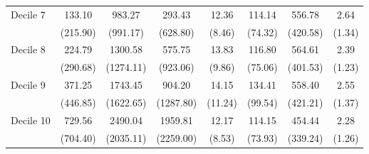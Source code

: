 \begin{spacing}{1.0}
\begin{table}[h]
\begin{threeparttable}
\begin{tabular}{l*{1}{ccccccc}}
\customlinespace Decile 7        &      133.10&      983.27&      293.43&       12.36&      114.14&      556.78&        2.64\\
          &      (215.90)&      (991.17)&      (628.80)&        (8.46)&       (74.32)&      (420.58)&        (1.34)\\



\customlinespace Decile 8        &      224.79&     1300.58&      575.75&       13.83&      116.80&      564.61&        2.39\\
          &      (290.68)&     (1274.11)&      (923.06)&        (9.86)&       (75.06)&      (401.53)&        (1.23)\\



\customlinespace Decile 9        &      371.25&     1743.45&      904.20&       14.15&      134.41&      558.40&        2.55\\
          &      (446.85)&     (1622.65)&     (1287.80)&       (11.24)&       (99.54)&      (421.21)&        (1.37)\\


\customlinespace Decile 10        &      729.56&     2490.04&     1959.81&       12.17&      114.15&      454.44&        2.28\\
          &      (704.40)&     (2035.11)&     (2259.00)&        (8.53)&       (73.93)&      (339.24)&        (1.26)\\

\bottomrule
\end{tabular}
        \end{threeparttable} 
\end{table} 
\end{spacing}